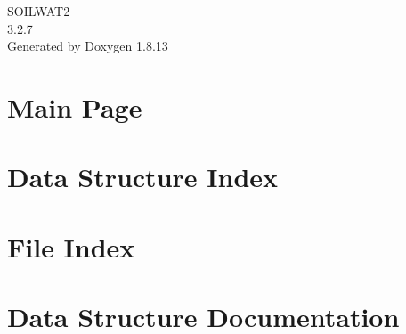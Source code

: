 \documentclass[twoside]{book}
\newcommand{\+}{\discretionary{\mbox{\scriptsize$\hookleftarrow$}}{}{}}
\newcommand{\clearemptydoublepage}{%
  \newpage{\pagestyle{empty}\cleardoublepage}%
}
\begin{document}
\hypersetup{pageanchor=false,
             bookmarksnumbered=true,
             pdfencoding=unicode
            }
\begin{titlepage}
\vspace*{7cm}
\begin{center}%
{\Large S\+O\+I\+L\+W\+A\+T2 \\[1ex]\large 3.\+2.\+7 }\\
\vspace*{1cm}
{\large Generated by Doxygen 1.8.13}\\
\end{center}
\end{titlepage}
\clearemptydoublepage
{}
\tableofcontents
\clearemptydoublepage
{}
\hypersetup{pageanchor=true}

\chapter{Main Page}
\label{index}\hypertarget{index}{}
\chapter{Data Structure Index}

\chapter{File Index}

\chapter{Data Structure Documentation}






















\end{document}
